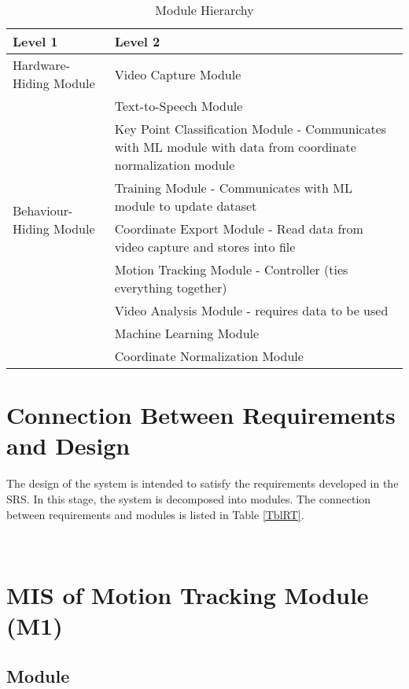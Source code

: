 \documentclass[12pt, titlepage]{article}
\begin{document}
\begin{table}[h!]
\centering
\begin{tabular}{p{} p{}}
\toprule
\textbf{Level 1} & \textbf{Level 2}\\
\midrule

{Hardware-Hiding Module} & Video Capture Module \\
\midrule

\multirow{7}{0.3\textwidth}{Behaviour-Hiding Module} & Text-to-Speech Module\\
& Key Point Classification Module - Communicates with ML module with data from coordinate normalization module\\
& Training Module - Communicates with ML module to update dataset\\
& Coordinate Export Module - Read data from video capture and stores into file\\
& Motion Tracking Module - Controller (ties everything together)\\

\midrule

\multirow{3}{0.3\textwidth}{Software Decision Module} & Video Analysis Module - requires data to be used\\
& Machine Learning Module\\
& Coordinate Normalization Module\\
\bottomrule


\end{tabular}
\caption{Module Hierarchy}
\label{TblMH}
\end{table}

\section{Connection Between Requirements and Design} \label{SecConnection}

The design of the system is intended to satisfy the requirements developed in
the SRS. In this stage, the system is decomposed into modules. The connection
between requirements and modules is listed in Table \ref{TblRT}.

\newpage
~\newpage

\section{MIS of Motion Tracking Module (M1)} \label{M1}

\subsection{Module}
\end{document}
